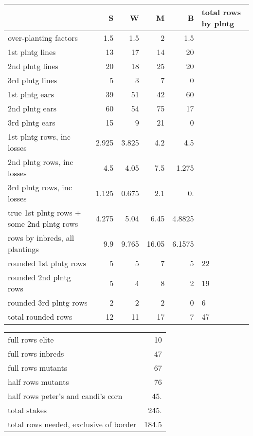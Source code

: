 \documentclass[11pt]{article}
\begin{document}
\begin{center}
\begin{tabular}{lrrrrl}
 & S & W & M & B & total rows by plntg\\
\hline
over-planting factors & 1.5 & 1.5 & 2 & 1.5 & \\
\hline
1st plntg lines & 13 & 17 & 14 & 20 & \\
2nd plntg lines & 20 & 18 & 25 & 20 & \\
3rd plntg lines & 5 & 3 & 7 & 0 & \\
\hline
1st plntg ears & 39 & 51 & 42 & 60 & \\
2nd plntg ears & 60 & 54 & 75 & 17 & \\
3rd plntg ears & 15 & 9 & 21 & 0 & \\
\hline
1st plntg rows, inc losses & 2.925 & 3.825 & 4.2 & 4.5 & \\
2nd plntg rows, inc losses & 4.5 & 4.05 & 7.5 & 1.275 & \\
3rd plntg rows, inc losses & 1.125 & 0.675 & 2.1 & 0. & \\
true 1st plntg rows + some 2nd plntg rows & 4.275 & 5.04 & 6.45 & 4.8825 & \\
rows by inbreds, all plantings & 9.9 & 9.765 & 16.05 & 6.1575 & \\
\hline
rounded 1st plntg rows & 5 & 5 & 7 & 5 & 22\\
rounded 2nd plntg rows & 5 & 4 & 8 & 2 & 19\\
rounded 3rd plntg rows & 2 & 2 & 2 & 0 & 6\\
total rounded rows & 12 & 11 & 17 & 7 & 47\\
\end{tabular}
\end{center}



\begin{center}
\begin{tabular}{lr}
\hline
full rows elite & 10\\
full rows inbreds & 47\\
full rows mutants & 67\\
half rows mutants & 76\\
half rows peter's and candi's corn & 45.\\
total stakes & 245.\\
total rows needed, exclusive of border & 184.5\\
\end{tabular}
\end{center}
\end{document}
